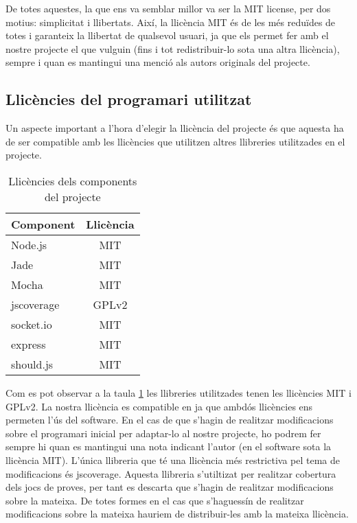 De totes aquestes, la que ens va semblar millor va ser la MIT license, per dos motius: simplicitat i llibertats. Així, la llicència MIT és de les més reduïdes de totes i garanteix la llibertat de qualsevol usuari, ja que els permet fer amb el nostre projecte el que vulguin (fins i tot redistribuir-lo sota una altra llicència), sempre i quan es mantingui una menció als autors originals del projecte.

\subsection{Llicències del programari utilitzat}

Un aspecte important a l'hora d'elegir la llicència del projecte és que aquesta ha de ser compatible amb les llicències que utilitzen altres llibreries utilitzades en el projecte. 

\begin{table}[htbp]\begin{center}\begin{tabular}{|l|c|}
\hline
\textbf{Component} & \textbf{Llicència} \\ \hline
Node.js & MIT \\ \hline
Jade & MIT\\ \hline
Mocha & MIT \\ \hline
jscoverage & GPLv2 \\ \hline
socket.io & MIT \\ \hline
express & MIT  \\ \hline
should.js & MIT \\ \hline
\end{tabular}\end{center}
\caption{Llicències dels components del projecte}\label{t:llicencies-components}
\end{table} 

Com es pot observar a la taula \ref{t:llicencies-components} les llibreries utilitzades tenen les llicències MIT i GPLv2. La nostra llicència es compatible en ja que ambdós llicències ens permeten l'ús del software. En el cas de que s'hagin de realitzar modificacions sobre el programari inicial per adaptar-lo al nostre projecte, ho podrem fer sempre hi quan es mantingui una nota indicant l'autor (en el software sota la llicència MIT). L'única llibreria que té una llicència més restrictiva pel tema de modificacions és jscoverage. Aquesta llibreria s'utiltizat per realitzar cobertura dels jocs de proves, per tant es descarta que s'hagin de realitzar modificacions sobre la mateixa. De totes formes en el cas que s'haguessín de realitzar modificacions sobre la mateixa hauriem de distribuir-les amb la mateixa llicència.

